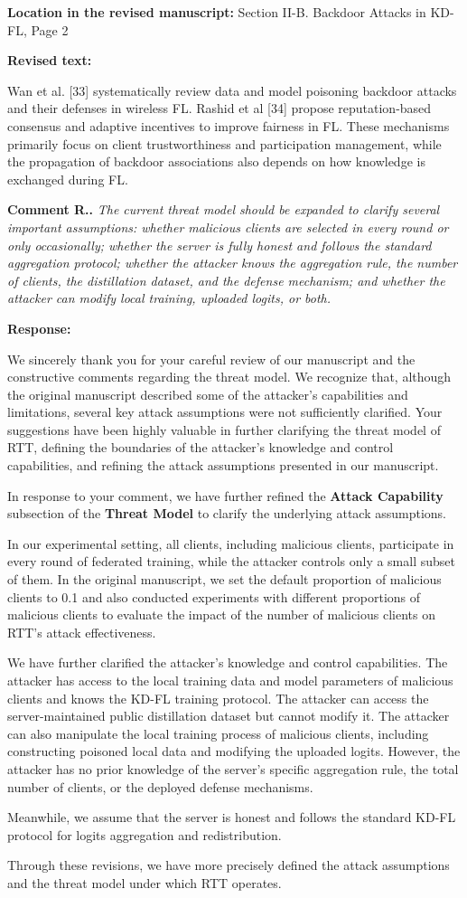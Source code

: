 \documentclass[11pt,a4paper]{article}
\newcommand{\manualindent}{\par\noindent\hspace*{1.5em}\ignorespaces}
\newcounter{reviewernum}
\newcounter{commentnum}
\newcommand{\reviewcomment}[1]{%
  \stepcounter{commentnum}%
  \begin{tcolorbox}[
      enhanced,breakable,colback=black!3,colframe=black!20,
      boxrule=0.5pt,arc=1.2mm,left=9pt,right=9pt,top=8pt,bottom=8pt]
    {\bfseries Comment R\arabic{reviewernum}.\arabic{commentnum}.}\quad
    {\itshape #1}
  \end{tcolorbox}%
}
\newcommand{\authorresponse}[1]{%
  {\bfseries\color{replyblue}Response:}\par
  #1\par\vspace{0.35em}%
}
\newcommand{\revisedtext}[2]{%
  {\bfseries\color{headingnavy}Location in the revised manuscript:} #1\par
  \begin{tcolorbox}[
      enhanced,breakable,colback=replyblue!3,colframe=replyblue!18,
      before upper={\setlength{\parskip}{6pt}},
      borderline west={2.5pt}{0pt}{replyblue},
      boxrule=0.5pt,arc=1mm,left=11pt,right=9pt,top=8pt,bottom=8pt]
    {\bfseries\color{headingnavy}Revised text:}\par
    #2
  \end{tcolorbox}
  \vspace{0.35em}%
}
\begin{document}
\revisedtext{Section II-B. Backdoor Attacks in KD-FL, Page 2}{Wan et al. [33] systematically review data and model poisoning backdoor attacks and their defenses in wireless FL.
Rashid et al [34] propose reputation-based consensus and adaptive incentives to improve fairness in FL.
These mechanisms primarily focus on client trustworthiness and participation management, while the propagation of backdoor associations also depends on how knowledge is exchanged during FL.}

\reviewcomment{The current threat model should be expanded to clarify several important assumptions: whether malicious clients are selected in every round or only occasionally; whether the server is fully honest and follows the standard aggregation protocol; whether the attacker knows the aggregation rule, the number of clients, the distillation dataset, and the defense mechanism; and whether the attacker can modify local training, uploaded logits, or both.}

\authorresponse{
\manualindent We sincerely thank you for your careful review of our manuscript and the constructive comments regarding the threat model.
We recognize that, although the original manuscript described some of the attacker's capabilities and limitations, several key attack assumptions were not sufficiently clarified.
Your suggestions have been highly valuable in further clarifying the threat model of RTT, defining the boundaries of the attacker's knowledge and control capabilities, and refining the attack assumptions presented in our manuscript.

\manualindent In response to your comment, we have further refined the \textbf{Attack Capability} subsection of the \textbf{Threat Model} to clarify the underlying attack assumptions.

\manualindent In our experimental setting, all clients, including malicious clients, participate in every round of federated training, while the attacker controls only a small subset of them.
In the original manuscript, we set the default proportion of malicious clients to 0.1 and also conducted experiments with different proportions of malicious clients to evaluate the impact of the number of malicious clients on RTT's attack effectiveness.

\manualindent We have further clarified the attacker's knowledge and control capabilities.
The attacker has access to the local training data and model parameters of malicious clients and knows the KD-FL training protocol.
The attacker can access the server-maintained public distillation dataset but cannot modify it.
The attacker can also manipulate the local training process of malicious clients, including constructing poisoned local data and modifying the uploaded logits.
However, the attacker has no prior knowledge of the server's specific aggregation rule, the total number of clients, or the deployed defense mechanisms.

\manualindent Meanwhile, we assume that the server is honest and follows the standard KD-FL protocol for logits aggregation and redistribution.

\manualindent Through these revisions, we have more precisely defined the attack assumptions and the threat model under which RTT operates.
}
\end{document}
